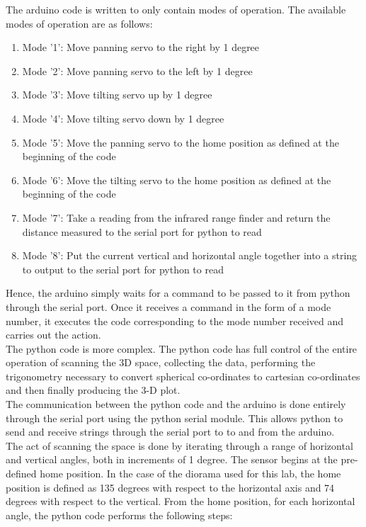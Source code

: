 \documentclass{article}
\begin{document}
The arduino code is written to only contain modes of operation. The available modes of operation are as follows:

\begin{enumerate}

\item Mode '1': Move panning servo to the right by 1 degree
\item Mode '2': Move panning servo to the left by 1 degree
\item Mode '3': Move tilting servo up by 1 degree
\item Mode '4': Move tilting servo down by 1 degree
\item Mode '5': Move the panning servo to the home position as defined at the beginning of the code
\item Mode '6': Move the tilting servo to the home position as defined at the beginning of the code
\item Mode '7': Take a reading from the infrared range finder and return the distance measured to the serial port for python to read
\item Mode '8': Put the current vertical and horizontal angle together into a string to output to the serial port for python to read

\end{enumerate}

Hence, the arduino simply waits for a command to be passed to it from python through the serial port. Once it receives a command in the form of a mode number, it executes the code corresponding to the mode number received and carries out the action. \\

The python code is more complex. The python code has full control of the entire operation of scanning the 3D space, collecting the data, performing the trigonometry necessary to convert spherical co-ordinates to cartesian co-ordinates and then finally producing the 3-D plot. \\

The communication between the python code and the arduino is done entirely through the serial port using the python serial module. This allows python to send and receive strings through the serial port to to and from the arduino. \\

The act of scanning the space is done by iterating through a range of horizontal and vertical angles, both in increments of 1 degree. The sensor begins at the pre-defined home position. In the case of the diorama used for this lab, the home position is defined as 135 degrees with respect to the horizontal axis and 74 degrees with respect to the vertical. From the home position, for each horizontal angle, the python code performs the following steps:
\end{document}
